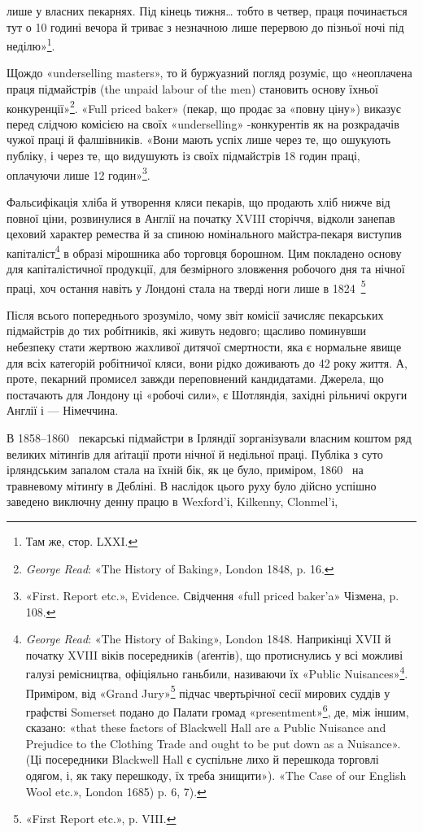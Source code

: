 \parcont{}  %
лише у власних пекарнях. Під кінець тижня\dots{} тобто в четвер,
праця починається тут о 10 годині вечора й триває з незначною
лише перервою до пізньої ночі під неділю»\footnote{
Там же, стор. LXXI.
}.

Щождо «underselling masters», то й буржуазний погляд розуміє,
що «неоплачена праця підмайстрів (the unpaid labour of
the men) становить основу їхньої конкуренції»\footnote{
\emph{George Read}: «The History of Baking», London 1848, p. 16.
}. «Full priced
baker» (пекар, що продає за «повну ціну») виказує перед слідчою
комісією на своїх «underselling» -конкурентів як на розкрадачів
чужої праці й фалшівників. «Вони мають успіх лише
через те, що ошукують публіку, і через те, що видушують із
своїх підмайстрів 18 годин праці, оплачуючи лише 12 годин»\footnote{
«First. Report etc.», Evidence. Свідчення «full priced baker’a» Чізмена,
p. 108.
}.

Фальсифікація хліба й утворення кляси пекарів, що продають
хліб нижче від повної ціни, розвинулися в Англії на початку
XVIII сторіччя, відколи занепав цеховий характер ремества й
за спиною номінального майстра-пекаря виступив капіталіст\footnote{
\emph{George Read}: «The History of Baking», London 1848. Наприкінці
XVII й початку XVIII віків посередників (аґентів), що протиснулись
у всі можливі галузі ремісництва, офіціяльно ганьбили, називаючи
їх «Public Nuisances»\footnote*{суспільним лихом. }.
Приміром, від «Grand Jury»\footnote*{Велике жюрі — суд присяжних. }
підчас чвертьрічної
сесії мирових суддів у графстві Somerset подано до Палати громад
«presentment»\footnote*{внесення. },
де, між іншим, сказано: «that these factors of Blackwell Hall
are a Public Nuisance and Prejudice to the Clothing Trade and ought to be
put down as a Nuisance». (Ці посередники Blackwell Hall є суспільне лихо
й перешкода торговлі одягом, і, як таку перешкоду, їх треба знищити»).
«The Case of our English Wool etc.», London 1685) p. 6, 7).
} в образі мірошника або торговця борошном. Цим покладено основу
для капіталістичної продукції, для безмірного зловження робочого
дня та нічної праці, хоч остання навіть у Лондоні стала на тверді
ноги лише в 1824~\footnote{«First Report etc.», p. VIII.}

Після всього попереднього зрозуміло, чому звіт комісії зачисляє
пекарських підмайстрів до тих робітників, які живуть
недовго; щасливо поминувши небезпеку стати жертвою жахливої
дитячої смертности, яка є нормальне явище для всіх категорій
робітничої кляси, вони рідко доживають до 42 року життя. А, проте,
пекарний промисел завжди переповнений кандидатами. Джерела,
що постачають для Лондону ці «робочі сили», є Шотляндія, західні
рільничі округи Англії і — Німеччина.

В 1858--1860~ пекарські підмайстри в Ірляндії зорганізували
власним коштом ряд великих мітинґів для аґітації проти
нічної й недільної праці. Публіка з суто ірляндським запалом
стала на їхній бік, як це було, приміром, 1860~ на травневому
мітинґу в Дебліні. В наслідок цього руху було дійсно успішно
заведено виключну денну працю в Wexford’і, Kilkenny, Clonmel’i,
\parbreak{}  %
